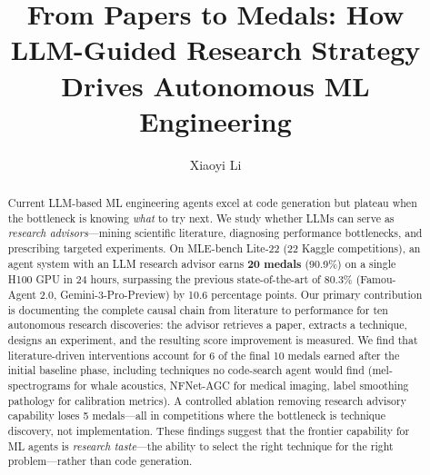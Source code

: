 \documentclass{article}
\title{From Papers to Medals: How LLM-Guided Research Strategy\\Drives Autonomous ML Engineering}
\author{
  Xiaoyi Li
}
\begin{document}
\maketitle

\begin{abstract}
Current LLM-based ML engineering agents excel at code generation but plateau when the bottleneck is knowing \emph{what} to try next. We study whether LLMs can serve as \emph{research advisors}---mining scientific literature, diagnosing performance bottlenecks, and prescribing targeted experiments. On MLE-bench Lite-22 (22 Kaggle competitions), an agent system with an LLM research advisor earns \textbf{20 medals} (90.9\%) on a single H100 GPU in 24 hours, surpassing the previous state-of-the-art of 80.3\% (Famou-Agent 2.0, Gemini-3-Pro-Preview) by 10.6 percentage points. Our primary contribution is documenting the complete causal chain from literature to performance for ten autonomous research discoveries: the advisor retrieves a paper, extracts a technique, designs an experiment, and the resulting score improvement is measured. We find that literature-driven interventions account for 6 of the final 10 medals earned after the initial baseline phase, including techniques no code-search agent would find (mel-spectrograms for whale acoustics, NFNet-AGC for medical imaging, label smoothing pathology for calibration metrics). A controlled ablation removing research advisory capability loses 5 medals---all in competitions where the bottleneck is technique discovery, not implementation. These findings suggest that the frontier capability for ML agents is \emph{research taste}---the ability to select the right technique for the right problem---rather than code generation.
\end{abstract}
\end{document}
